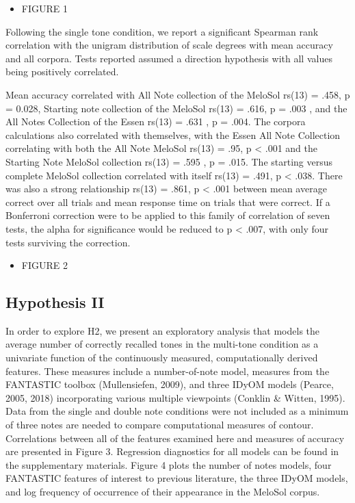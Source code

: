 \documentclass[english,man]{apa6}
\providecommand{\tightlist}{%
  \setlength{\itemsep}{0pt}\setlength{\parskip}{0pt}}
\begin{document}
\begin{itemize}
\tightlist
\item
  FIGURE 1
\end{itemize}

Following the single tone condition, we report a significant Spearman rank correlation with the unigram distribution of scale degrees with mean accuracy and all corpora.
Tests reported assumed a direction hypothesis with all values being positively correlated.

Mean accuracy correlated with All Note collection of the MeloSol rs(13) = .458, p = 0.028, Starting note collection of the MeloSol rs(13) = .616, p = .003 , and the All Notes Collection of the Essen rs(13) = .631 , p = .004.
The corpora calculations also correlated with themselves, with the Essen All Note Collection correlating with both the All Note MeloSol rs(13) = .95, p \textless{} .001 and the Starting Note MeloSol collection rs(13) = .595 , p = .015.
The starting versus complete MeloSol collection correlated with itself rs(13) = .491, p \textless{} .038.
There was also a strong relationship rs(13) = .861, p \textless{} .001 between mean average correct over all trials and mean response time on trials that were correct.
If a Bonferroni correction were to be applied to this family of correlation of seven tests, the alpha for significance would be reduced to p \textless{} .007, with only four tests surviving the correction.

\begin{itemize}
\tightlist
\item
  FIGURE 2
\end{itemize}

\hypertarget{hypothesis-ii}{%
\subsection{Hypothesis II}\label{hypothesis-ii}}

In order to explore H2, we present an exploratory analysis that models the average number of correctly recalled tones in the multi-tone condition as a univariate function of the continuously measured, computationally derived features. These measures include a number-of-note model, measures from the FANTASTIC toolbox (Mullensiefen, 2009), and three IDyOM models (Pearce, 2005, 2018) incorporating various multiple viewpoints (Conklin \& Witten, 1995).
Data from the single and double note conditions were not included as a minimum of three notes are needed to compare computational measures of contour.
Correlations between all of the features examined here and measures of accuracy are presented in Figure 3.
Regression diagnostics for all models can be found in the supplementary materials.
Figure 4 plots the number of notes models, four FANTASTIC features of interest to previous literature, the three IDyOM models, and log frequency of occurrence of their appearance in the MeloSol corpus.
\end{document}
